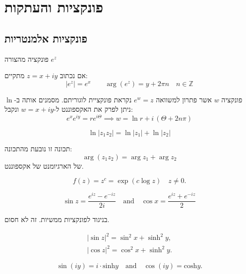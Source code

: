 \documentclass{tstextbook}
\begin{document}
\chapter{פונקציות והעתקות}

\section{פונקציות אלמנטריות}

\begin{definition}
פונקציה מהצורה \(e^z\)

\end{definition}
\begin{proposition}
אם נכתוב \(z=x+iy\) מתקיים:
$$\lvert e^z \rvert =e^x\qquad \arg(e^z)=y+2\pi n\quad n\in \mathbb{Z}$$

\end{proposition}
\begin{definition}
פונקציה \(w\) אשר פתרון למשוואה \(e^w=z\) נקראת פונקציית לוגוריתם. מסמנים אותה ב-\(\ln\) ניתן לפרק את האקספוננט ל-\(w=x+iy\) ונקבל:
$$e^xe^{iy}=re^{i\Theta} \implies w=\ln r+i\,\left( \Theta+2n\pi 
\right)$$

\end{definition}
\begin{proposition}
$$\ln|z_{1}z_{2}|=\ln|z_{1}|+\ln|z_{2}|$$

\end{proposition}
תכונה זו נובעת מהתכונה:
$$\arg(z_{1}z_{2})=\arg z_{1}+\arg z_{2}$$
של הארגיומנט של אקספוננט.

\begin{definition}
$$f(z)=z^{c}=\exp(c\log z)\quad z\neq0.$$

\end{definition}
\begin{definition}
$$\sin z={\frac{e^{i z}-e^{-i z}}{2i}}\quad{\mathrm{and}}\quad\cos x={\frac{e^{i z}+e^{-i z}}{2}}$$

\end{definition}
בניגוד לפונקציות ממשיות. זה לא חסום.

\begin{proposition}
$$\begin{array}{l}{{|\sin z|^{2}=\sin^{2}x+\sinh^{2}y,}}\\ {{|\cos z|^{2}=\cos^{2}x+\sinh^{2}y.}}\end{array}$$

\end{proposition}
\begin{proposition}
$$\sin(i y)=i\cdot\mathrm{sinh}y\quad\mathrm{and}\quad\cos(i y)=\mathrm{cosh}y.$$

\end{proposition}
\end{document}
